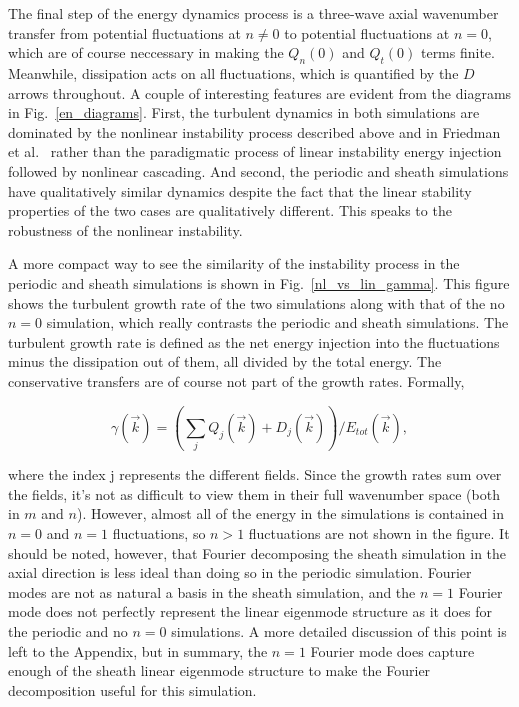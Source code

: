 \documentclass[showpacs,preprintnumbers,amsmath,amssymb,superscriptaddress,aip]{revtex4-1}
\def\beq{\begin{equation}}
\def\eeq{\end{equation}}
\begin{document}
The final step of the energy dynamics process is a three-wave axial wavenumber transfer from potential fluctuations at $n \ne 0$ to potential fluctuations at $n=0$, which are of course neccessary
in making the $Q_n(0)$ and $Q_t(0)$ terms finite. Meanwhile, dissipation acts on all fluctuations, which is quantified by the $D$ arrows throughout. A couple of interesting features are evident
from the diagrams in Fig.~\ref{en_diagrams}. 
First, the turbulent dynamics in both simulations are dominated by the nonlinear instability process described above and in Friedman et al.~\cite{friedman2012b}
rather than the paradigmatic process of linear instability energy injection followed by nonlinear cascading. And second,
the periodic and sheath simulations have qualitatively similar dynamics despite the fact that the linear stability properties of the two cases
are qualitatively different. This speaks to the robustness of the nonlinear instability.

A more compact way to see the similarity of the instability process in the periodic and sheath simulations is shown in Fig.~\ref{nl_vs_lin_gamma}. 
This figure shows the turbulent growth rate of the two simulations along with that of the no $n=0$ simulation, which really contrasts the periodic and sheath simulations. 
The turbulent growth rate is defined as the net energy injection
into the fluctuations minus the dissipation out of them, all divided by the total energy. The conservative transfers are of course not part of the growth rates.
Formally, 

\beq
\label{gamma_def}
\gamma(\vec{k}) = (\sum_j Q_j(\vec{k}) + D_j(\vec{k}))/E_{tot}(\vec{k}), 
\eeq

where the index j represents the different fields.
Since the growth rates sum over the fields, it's not as difficult to view them in their full wavenumber space (both in $m$ and $n$). However, almost all of the energy in the simulations is 
contained in $n=0$ and $n=1$ fluctuations, so $n>1$ fluctuations are not shown in the figure. It should be noted, however, that Fourier decomposing the sheath simulation in the axial direction
is less ideal than doing so in the periodic simulation. Fourier modes are not as natural a basis in the sheath simulation, and the $n=1$ Fourier mode does not perfectly represent the linear
eigenmode structure as it does for the periodic and no $n=0$ simulations. 
A more detailed discussion of this point is left to the Appendix, but in summary, the $n=1$ Fourier mode does capture enough of the sheath
linear eigenmode structure to make the Fourier decomposition useful for this simulation.
\end{document}
